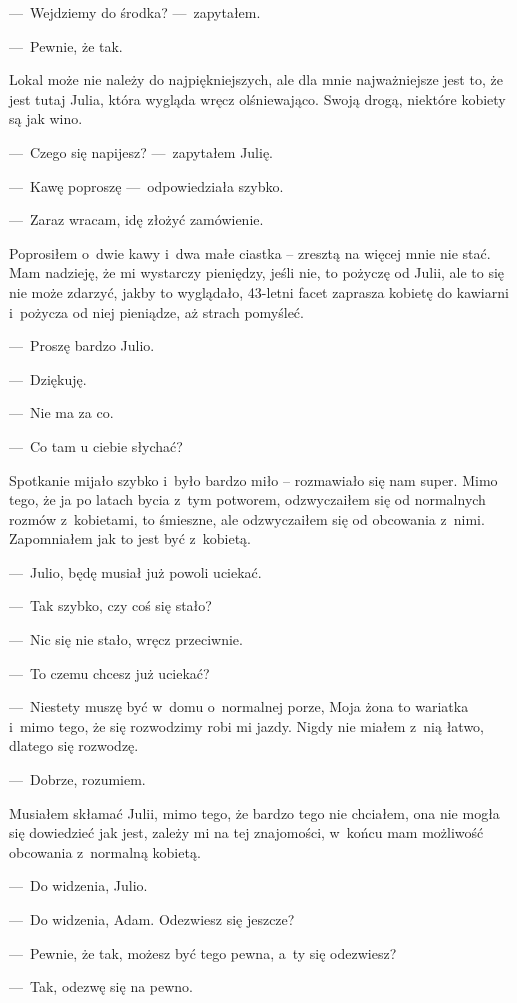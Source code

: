 ---~Wejdziemy do środka? ---~zapytałem.

---~Pewnie, że tak.

Lokal może nie należy do najpiękniejszych, ale dla mnie najważniejsze jest to, że jest tutaj Julia, która wygląda wręcz olśniewająco. Swoją drogą, niektóre kobiety są jak wino.

---~Czego się napijesz? ---~zapytałem Julię.

---~Kawę poproszę ---~odpowiedziała szybko.

---~Zaraz wracam, idę złożyć zamówienie.

Poprosiłem o~dwie kawy i~dwa małe ciastka -- zresztą na więcej mnie nie stać. Mam nadzieję, że mi wystarczy pieniędzy, jeśli nie, to pożyczę od Julii, ale to się nie może zdarzyć, jakby to wyglądało, 43-letni facet zaprasza kobietę do kawiarni i~pożycza od niej pieniądze, aż strach pomyśleć.

---~Proszę bardzo Julio.

---~Dziękuję.

---~Nie ma za co.

---~Co tam u ciebie słychać?

Spotkanie mijało szybko i~było bardzo miło -- rozmawiało się nam super. Mimo tego, że ja po latach bycia z~tym potworem, odzwyczaiłem się od normalnych rozmów z~kobietami, to śmieszne, ale odzwyczaiłem się od obcowania z~nimi. Zapomniałem jak to jest być z~kobietą.

---~Julio, będę musiał już powoli uciekać.

---~Tak szybko, czy coś się stało?

---~Nic się nie stało, wręcz przeciwnie.

---~To czemu chcesz już uciekać?

---~Niestety muszę być w~domu o~normalnej porze, Moja żona to wariatka i~mimo tego, że się rozwodzimy robi mi jazdy. Nigdy nie miałem z~nią łatwo, dlatego się rozwodzę.

---~Dobrze, rozumiem.

Musiałem skłamać Julii, mimo tego, że bardzo tego nie chciałem, ona nie mogła się dowiedzieć jak jest, zależy mi na tej znajomości, w~końcu mam możliwość obcowania z~normalną kobietą.

---~Do widzenia, Julio.

---~Do widzenia, Adam. Odezwiesz się jeszcze?

---~Pewnie, że tak, możesz być tego pewna, a~ty się odezwiesz?

---~Tak, odezwę się na pewno.


